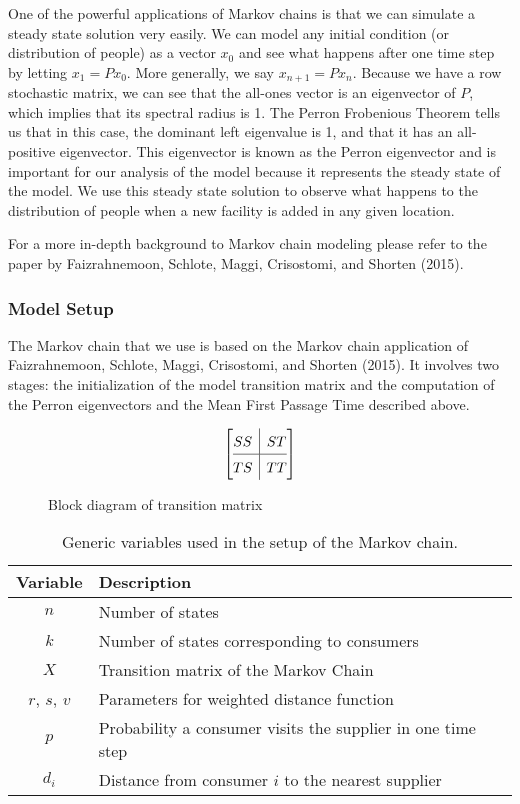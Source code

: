 \documentclass[twoside,twocolumn]{article}
\begin{document}
One of the powerful applications of Markov chains is that we can simulate a steady state solution very easily.
We can model any initial condition (or distribution of people) as a vector $x_0$ and see what happens after one time step by letting $x_1 = P x_0$.
More generally, we say $x_{n + 1} = P x_n$.
Because we have a row stochastic matrix, we can see that the all-ones vector is an eigenvector of $P$, which implies that its spectral radius is 1. %
The Perron Frobenious Theorem tells us that in this case, the dominant left eigenvalue is 1, and that it has an all-positive eigenvector.%
This eigenvector is known as the Perron eigenvector and is important for our analysis of the model because it represents the steady state of the model. %
We use this steady state solution to observe what happens to the distribution of people when a new facility is added in any given location.

For a more in-depth background to Markov chain modeling please refer to the paper by Faizrahnemoon, Schlote, Maggi, Crisostomi, and Shorten (2015).


\subsubsection{Model Setup}

The Markov chain that we use is based on the Markov chain application of Faizrahnemoon, Schlote, Maggi, Crisostomi, and Shorten (2015).
It involves two stages: the initialization of the model transition matrix and the computation of the Perron eigenvectors and the Mean First Passage Time described above.
\begin{figure}
\[
\renewcommand{\arraystretch}{1.5} %
\left[\begin{array}{@{}c|c@{}}
  SS &
  ST
\\ \hline
  TS
  & TT
\end{array}\right]
\]
\caption{Block diagram of transition matrix}
\end{figure}

\begin{table}
\begin{tabular}{c | p{5cm}}
Variable & Description\\
\hline
$n$ & Number of states\\
$k$ & Number of states corresponding to consumers\\
$X$ & Transition matrix of the Markov Chain\\
$r$, $s$, $v$ & Parameters for weighted distance function\\
$p$ & Probability a consumer visits the supplier in one time step\\
$d_{i}$ & Distance from consumer $i$ to the nearest supplier\\
\end{tabular}
\caption{Generic variables used in the setup of the Markov chain.}
\end{table}
\end{document}
